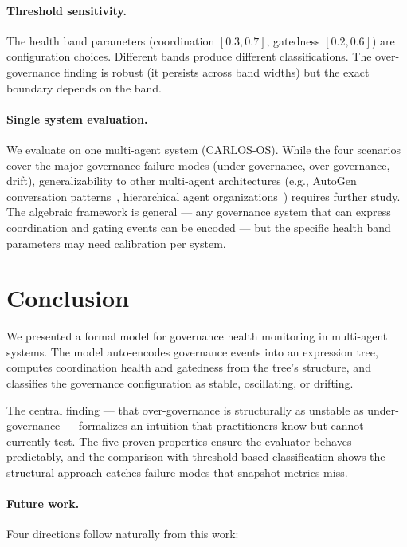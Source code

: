 \documentclass[sigconf,nonacm]{acmart}
\begin{document}
\paragraph{Threshold sensitivity.}
The health band parameters (coordination $[0.3, 0.7]$, gatedness
$[0.2, 0.6]$) are configuration choices. Different bands produce different
classifications. The over-governance finding is robust (it persists across
band widths) but the exact boundary depends on the band.

\paragraph{Single system evaluation.}
We evaluate on one multi-agent system (CARLOS-OS). While the four scenarios
cover the major governance failure modes (under-governance, over-governance,
drift), generalizability to other multi-agent architectures (e.g., AutoGen
conversation patterns~\cite{autogen}, hierarchical agent
organizations~\cite{bose}) requires further study. The algebraic framework
is general --- any governance system that can express coordination and
gating events can be encoded --- but the specific health band parameters
may need calibration per system.


\section{Conclusion}

We presented a formal model for governance health monitoring in
multi-agent systems. The model auto-encodes governance events into an
expression tree, computes coordination health and gatedness from the
tree's structure, and classifies the governance configuration as stable,
oscillating, or drifting.

The central finding --- that over-governance is structurally as unstable
as under-governance --- formalizes an intuition that practitioners know
but cannot currently test. The five proven properties ensure the
evaluator behaves predictably, and the comparison with threshold-based
classification shows the structural approach catches failure modes
that snapshot metrics miss.

\paragraph{Future work.}
Four directions follow naturally from this work:
\end{document}
